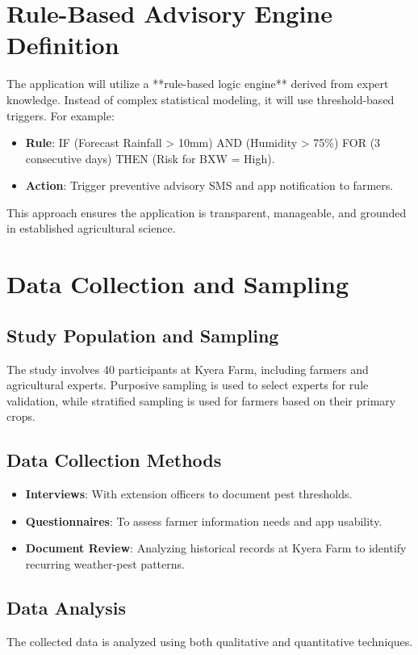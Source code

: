 \documentclass[12pt]{report}
\begin{document}
\section{Rule-Based Advisory Engine Definition}
The application will utilize a **rule-based logic engine** derived from expert knowledge. Instead of complex statistical modeling, it will use threshold-based triggers. For example:
\begin{itemize}
    \item \textbf{Rule}: IF (Forecast Rainfall > 10mm) AND (Humidity > 75\%) FOR (3 consecutive days) THEN (Risk for BXW = High).
    \item \textbf{Action}: Trigger preventive advisory SMS and app notification to farmers.
\end{itemize}
This approach ensures the application is transparent, manageable, and grounded in established agricultural science.

\section{Data Collection and Sampling}
\subsection{Study Population and Sampling}
The study involves 40 participants at Kyera Farm, including farmers and agricultural experts. Purposive sampling is used to select experts for rule validation, while stratified sampling is used for farmers based on their primary crops.

\subsection{Data Collection Methods}
\begin{itemize}
    \item \textbf{Interviews}: With extension officers to document pest thresholds.
    \item \textbf{Questionnaires}: To assess farmer information needs and app usability.
    \item \textbf{Document Review}: Analyzing historical records at Kyera Farm to identify recurring weather-pest patterns.
\end{itemize}

\subsection{Data Analysis}
The collected data is analyzed using both qualitative and quantitative techniques.
\end{document}
